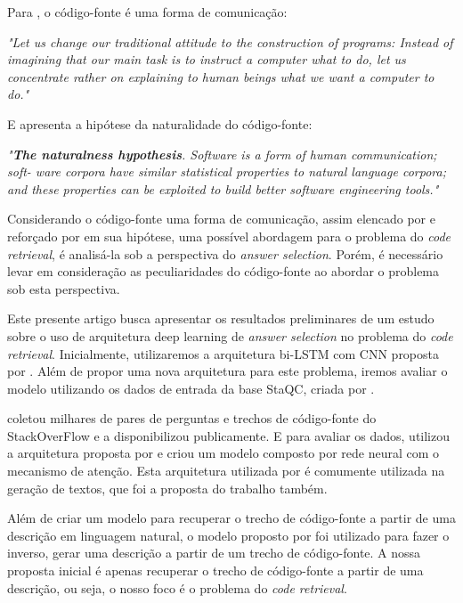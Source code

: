 \documentclass[12pt]{article}
\begin{document}
Para \cite{Knuth:1984:LP}, 
o código-fonte é uma forma de comunicação:

\textit{"Let us change our traditional attitude to the construction of programs: Instead of imagining that our
main task is to instruct a computer what to do, let us
concentrate rather on explaining to human beings what
we want a computer to do."}

E \cite{Allamanis:2018:SML} apresenta a hipótese da naturalidade do código-fonte:

\textit{"\textbf{The naturalness hypothesis}. Software is a form of human communication; soft-
ware corpora have similar statistical properties to natural language corpora; and these
properties can be exploited to build better software engineering tools."}

Considerando o código-fonte uma forma de comunicação, assim elencado por \cite{Knuth:1984:LP} e reforçado por \cite{Allamanis:2018:SML} em sua hipótese, uma possível abordagem para o problema 
do \textit{code retrieval}, é analisá-la sob a perspectiva do \textit{answer selection}. Porém, é necessário levar em consideração as peculiaridades do código-fonte ao abordar o problema sob esta perspectiva. 

Este presente artigo busca apresentar os resultados preliminares de um estudo sobre o uso de arquitetura deep learning de \textit{answer selection} no problema do \textit{code retrieval}.
Inicialmente, utilizaremos a arquitetura bi-LSTM com CNN proposta por \cite{tan-lstm-qa}. Além de propor uma nova arquitetura para este problema, iremos avaliar o modelo 
utilizando os dados de entrada da base StaQC, criada por \cite{Yao-staqc:2018}. 

\cite{Yao-staqc:2018} coletou milhares de pares de perguntas e trechos de código-fonte do StackOverFlow e a 
disponibilizou publicamente. E para avaliar os dados, \cite{Yao-staqc:2018} utilizou a arquitetura proposta por \cite{iyer-etal-2016-summarizing} e criou um modelo composto por rede neural com o mecanismo 
de atenção. Esta arquitetura utilizada por \cite{iyer-etal-2016-summarizing} é comumente utilizada na geração de textos, que foi a proposta do trabalho também. 

Além de criar um modelo
para recuperar o trecho de código-fonte a partir de uma descrição em linguagem natural, o modelo proposto por \cite{iyer-etal-2016-summarizing} foi utilizado para fazer o inverso, gerar uma descrição
a partir de um trecho de código-fonte. A nossa proposta inicial é apenas recuperar o trecho de código-fonte a partir de uma descrição, ou seja, o nosso foco é o problema do \textit{code retrieval}.
\end{document}
